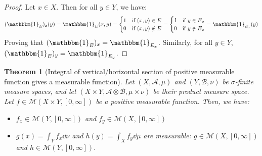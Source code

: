 \documentclass{article}
\newtheorem{theorem}{Theorem}[section]
\theoremstyle{definition}
\theoremstyle{remark}
\theoremstyle{example}
\theoremstyle{notation}
\newcommand{\tif}{\text{if }}
\begin{document}
\begin{proof}
		Let $x \in X$. Then for all $y \in Y$, we have:
				$$(\mathbbm{1}_E)_x(y) = \mathbbm{1}_{E}(x, y) = \begin{cases}1 & \tif (x, y) \in E\\0 & \tif (x, y) \notin E\end{cases} = \begin{cases}1 & \tif y \in E_x\\0 & \tif y \notin E_x\end{cases} = \mathbbm{1}_{E_x}(y)$$
		Proving that $(\mathbbm{1}_E)_x = \mathbbm{1}_{E_x}$. Similarly, for all $y \in Y$, $(\mathbbm{1}_E)_y = \mathbbm{1}_{E_y}$.
\end{proof}

\begin{theorem}[Integral of vertical/horizontal section of positive measurable function gives a measurable function] %
		Let $(X, \mathcal{A}, \mu)$ and $(Y, \mathcal{B}, \nu)$ be $\sigma$-finite measure spaces, and let $(X \times Y, \mathcal{A} \otimes \mathcal{B}, \mu \times \nu)$ be their product measure space. Let $f \in \mathcal{M}(X \times Y, [0, \infty])$ be a positive measurable function. Then, we have:
		\begin{itemize}
				\item $f_x \in \mathcal{M}(Y, [0, \infty])$ and $f_y \in \mathcal{M}(X, [0, \infty])$
				\item $g(x) = \int_Y f_x \dd \nu$ and $h(y) = \int_X f_y \dd \mu$ are measurable: $g \in \mathcal{M}(X, [0, \infty])$ and $h \in \mathcal{M}(Y, [0, \infty])$.%
		\end{itemize}
\end{theorem}
\end{document}
